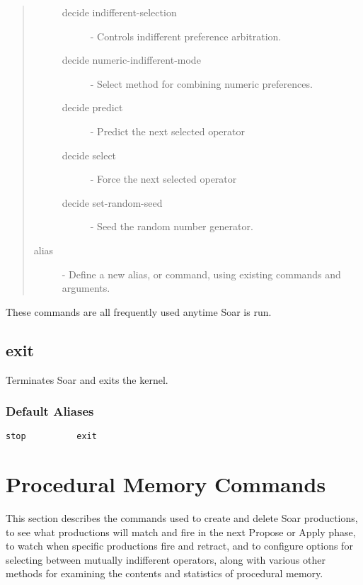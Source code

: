 \begin{quote}
\begin{description}
		\begin{description}
			\item[decide indifferent-selection] -  Controls indifferent preference arbitration.
			\item[decide numeric-indifferent-mode] - Select method for combining numeric preferences.
			\item[decide predict] - Predict the next selected operator 
			\item[decide select] - Force the next selected operator 
			\item[decide set-random-seed] - Seed the random number generator.
		\end{description}
		\item[alias] - Define a new alias, or command, using existing commands and arguments.
	\end{description}
\end{quote}

These commands are all frequently used anytime Soar is run.

\divider 
 

\divider 


\divider 
\subsection{exit}\label{exit}
Terminates Soar and exits the kernel.
\subsubsection{Default Aliases}
\verb|stop          exit|

\divider


\divider 


\divider 


\divider 


\section{Procedural Memory Commands}
\label{INTERFACE-procedural-memory}

This section describes the commands used to create and delete Soar productions, to see what productions will match and fire in the next Propose or Apply phase, to watch when specific productions fire and retract, and to configure options for selecting between mutually indifferent operators, along with various other methods for examining the contents and statistics of procedural memory. 

